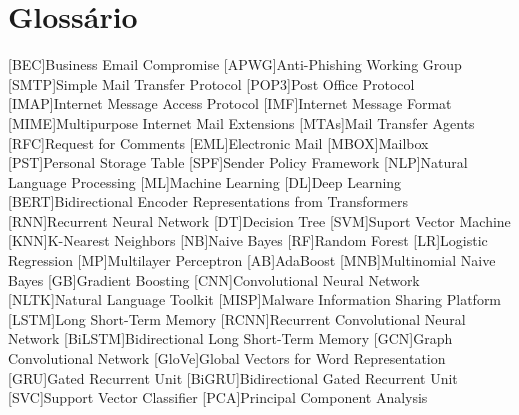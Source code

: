 \chapter{Glossário}

\footnotesize
\SingleSpacing

\begin{multicols}{2}
\begin{acronym}[AAAAAA]

	[BEC]{Business Email Compromise}
    [APWG]{Anti-Phishing Working Group}
	[SMTP]{Simple Mail Transfer Protocol}
	[POP3]{Post Office Protocol}
	[IMAP]{Internet Message Access Protocol}
	[IMF]{Internet Message Format}
	[MIME]{Multipurpose Internet Mail Extensions}
	[MTAs]{Mail Transfer Agents}
	[RFC]{Request for Comments}
	[EML]{Electronic Mail}
	[MBOX]{Mailbox}
	[PST]{Personal Storage Table}
	[SPF]{Sender Policy Framework}
	[NLP]{Natural Language Processing}
	[ML]{Machine Learning}
	[DL]{Deep Learning}
	[BERT]{Bidirectional Encoder Representations from Transformers}
	[RNN]{Recurrent Neural Network}
	[DT]{Decision Tree}
	[SVM]{Suport Vector Machine}
	[KNN]{K-Nearest Neighbors}
	[NB]{Naive Bayes}
	[RF]{Random Forest}
	[LR]{Logistic Regression}
	[MP]{Multilayer Perceptron}
	[AB]{AdaBoost}
	[MNB]{Multinomial Naive Bayes}
	[GB]{Gradient Boosting}
	[CNN]{Convolutional Neural Network}
	[NLTK]{Natural Language Toolkit}
	[MISP]{Malware Information Sharing Platform}
	[LSTM]{Long Short-Term Memory}
	[RCNN]{Recurrent Convolutional Neural Network}
	[BiLSTM]{Bidirectional Long Short-Term Memory}
	[GCN]{Graph Convolutional Network}
	[GloVe]{Global Vectors for Word Representation}
	[GRU]{Gated Recurrent Unit}
	[BiGRU]{Bidirectional Gated Recurrent Unit}
	[SVC]{Support Vector Classifier}
	[PCA]{Principal Component Analysis}

\end{acronym}
\end{multicols}

